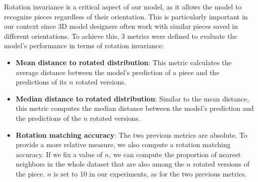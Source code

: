 Rotation invariance is a critical aspect of our model, as it allows the model to recognize pieces regardless of their orientation. This is particularly important in our context since 3D model designers often work with similar pieces saved in different orientations. To achieve this, 3 metrics were defined to evaluate the model's performance in terms of rotation invariance:
\begin{itemize}
    \item \textbf{Mean distance to rotated distribution}: This metric calculates the average distance between the model's prediction of a piece and the predictions of its $n$ rotated versions. 
    \item \textbf{Median distance to rotated distribution}: Similar to the mean distance, this metric computes the median distance between the model's prediction and the predictions of the $n$ rotated versions.
    \item \textbf{Rotation matching accuracy}: The two previous metrics are absolute. To provide a more relative measure, we also compute a rotation matching accuracy. If we fix a value of $n$, we can compute the proportion of nearest neighbors in the whole dataset that are also among the $n$ rotated versions of the piece. $n$ is set to 10 in our experiments, as for the two previous metrics.
\end{itemize}


